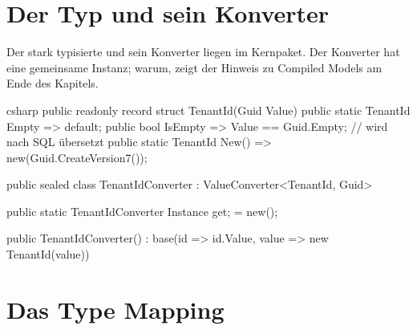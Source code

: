 \section{Der Typ und sein Konverter}

Der stark typisierte  und sein Konverter liegen im Kernpaket.
Der Konverter hat eine gemeinsame Instanz; warum, zeigt der Hinweis zu Compiled Models am
Ende des Kapitels.

\begin{sourcecode}{csharp}
public readonly record struct TenantId(Guid Value)
{
    public static TenantId Empty => default;
    public bool IsEmpty => Value == Guid.Empty;              // wird nach SQL übersetzt
    public static TenantId New() => new(Guid.CreateVersion7());
}

public sealed class TenantIdConverter : ValueConverter<TenantId, Guid>
{
    public static TenantIdConverter Instance { get; } = new();

    public TenantIdConverter()
        : base(id => id.Value, value => new TenantId(value))
    {
    }
}
\end{sourcecode}

\section{Das Type Mapping}

